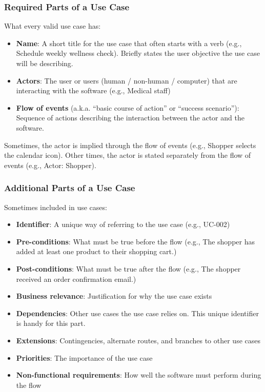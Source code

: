 \subsubsection*{Required Parts of a Use Case}

What every valid use case has:

\begin{itemize}
\item \textbf{Name}: A short title for the use case that often starts with a verb (e.g., Schedule weekly wellness check). Briefly states the user objective the use case will be describing.
\item \textbf{Actors}: The user or users (human / non-human / computer) that are interacting with the software (e.g., Medical staff)
\item \textbf{Flow of events} (a.k.a. ``basic course of action'' or ``success scenario''): Sequence of actions describing the interaction between the actor and the software.
\end{itemize}

Sometimes, the actor is implied through the flow of events (e.g., Shopper selects the calendar icon). Other times, the actor is stated separately from the flow of events (e.g., Actor: Shopper).

\subsubsection*{Additional Parts of a Use Case}

Sometimes included in use cases:\\

\begin{itemize}
\item \textbf{Identifier}: A unique way of referring to the use case (e.g., UC-002)
\item \textbf{Pre-conditions}: What must be true before the flow (e.g., The shopper has added at least one product to their shopping cart.)
\item \textbf{Post-conditions}: What must be true after the flow (e.g., The shopper received an order confirmation email.)
\item \textbf{Business relevance}: Justification for why the use case exists
\item \textbf{Dependencies}: Other use cases the use case relies on. This unique identifier is handy for this part.
\item \textbf{Extensions}: Contingencies, alternate routes, and branches to other use cases
\item \textbf{Priorities}: The importance of the use case
\item \textbf{Non-functional requirements}: How well the software must perform during the flow
\end{itemize}

